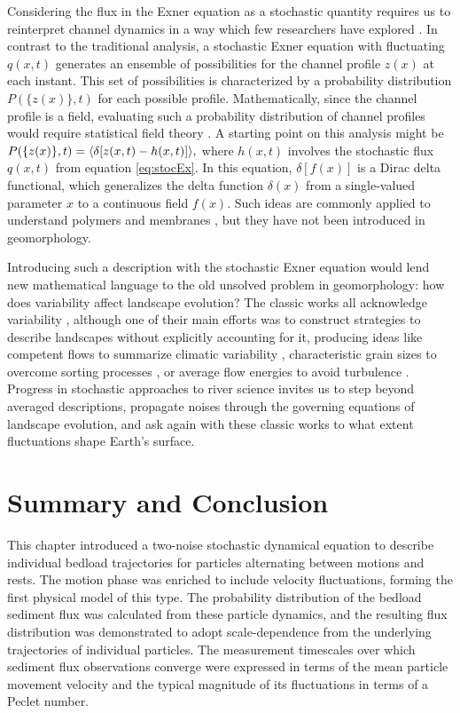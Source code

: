 Considering the flux in the Exner equation as a stochastic quantity requires us to reinterpret channel dynamics in a way which few researchers have explored \citep{Jerolmack2005,Bohorquez2014}.
In contrast to the traditional analysis, a stochastic Exner equation with fluctuating $q(x,t)$ generates an ensemble of possibilities for the channel profile $z(x)$ at each instant. This set of possibilities is characterized by a probability distribution $P(\{z(x)\},t)$ for each possible profile.
Mathematically, since the channel profile is a field, evaluating such a probability distribution of channel profiles would require statistical field theory \citep{Kardar2007}.
A starting point on this analysis might be $P(\{z(x)\},t) = \langle \delta[z(x,t)-h(x,t)]\rangle,$ where $h(x,t)$ involves the stochastic flux $q(x,t)$ from equation \ref{eq:stocEx}.
In this equation, $\delta[f(x)]$ is a Dirac delta functional, which generalizes the delta function $\delta(x)$ from a single-valued parameter $x$ to a continuous field $f(x)$.
Such ideas are commonly applied to understand polymers and membranes \citep{Kawakatsu2004,Nelson2004}, but they have not been introduced in geomorphology.

Introducing such a description with the stochastic Exner equation would lend new mathematical language to the old unsolved problem in geomorphology: how does variability affect landscape evolution?
The classic works all acknowledge variability \citep{Leopold1952}, although one of their main efforts was to construct strategies to describe landscapes without explicitly accounting for it, producing ideas like competent flows to summarize climatic variability \citep{Wolman1960}, characteristic grain sizes to overcome sorting processes \citep{Parker1982}, or average flow energies to avoid turbulence \citep{Bagnold1954}.
Progress in stochastic approaches to river science \citep[e.g.][]{Furbish2021c,Ancey2020b} invites us to step beyond averaged descriptions, propagate noises through the governing equations of landscape evolution, and ask again with these classic works to what extent fluctuations shape Earth's surface.

\section{Summary and Conclusion \label{sec:conc}} 
 
This chapter introduced a two-noise stochastic dynamical equation to describe individual bedload trajectories for particles alternating between motions and rests. The motion phase was enriched to include velocity fluctuations, forming the first physical model of this type.
The probability distribution of the bedload sediment flux was calculated from these particle dynamics, and the resulting flux distribution was demonstrated to adopt scale-dependence from the underlying trajectories of individual particles. The measurement timescales over which sediment flux observations converge were expressed in terms of the mean particle movement velocity and the typical magnitude of its fluctuations in terms of a Peclet number.
 
